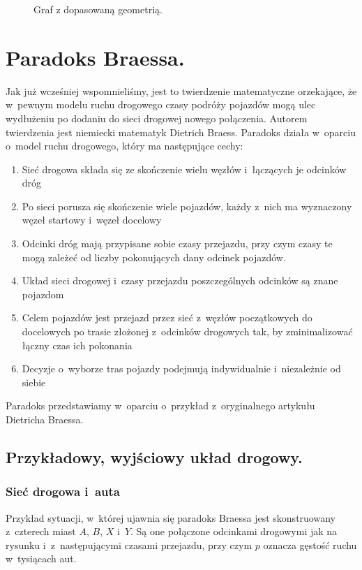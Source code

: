 \documentclass[twoside,12pt]{report}
\begin{document}
\begin{figure}[h]
\begin{flushright}
\begin{minipage}[]{.45\textwidth}
	\caption{Graf z dopasowaną geometrią.}
	\end{minipage}
\end{flushright}
\end{figure}

\section{Paradoks Braessa.}

Jak już wcześniej wspomnieliśmy, jest to twierdzenie matematyczne orzekające, że w~pewnym modelu ruchu drogowego czasy podróży pojazdów mogą ulec wydłużeniu po dodaniu do sieci drogowej nowego połączenia. Autorem twierdzenia jest niemiecki matematyk Dietrich Braess\cite{braess}. Paradoks działa w~oparciu o~model ruchu drogowego, który ma następujące cechy:

\begin{enumerate}
\item Sieć drogowa składa się ze skończenie wielu węzłów i~łączących je odcinków dróg
\item Po sieci porusza się skończenie wiele pojazdów, każdy z~nich ma wyznaczony węzeł startowy i~węzeł docelowy
\item Odcinki dróg mają przypisane sobie czasy przejazdu, przy czym czasy te mogą zależeć od liczby pokonujących dany odcinek pojazdów.
\item Układ sieci drogowej i~czasy przejazdu poszczególnych odcinków są znane pojazdom
\item Celem pojazdów jest przejazd przez sieć z~węzłów początkowych do docelowych po trasie złożonej z~odcinków drogowych tak, by zminimalizować łączny czas ich pokonania
\item Decyzje o~wyborze tras pojazdy podejmują indywidualnie i~niezależnie od siebie
\end{enumerate}
Paradoks przedstawiamy w~oparciu o~przykład z~oryginalnego artykułu Dietricha Braessa\cite{paradox}.

\subsection{Przykładowy, wyjściowy układ drogowy.}
\subsubsection{Sieć drogowa i~auta}

Przykład sytuacji, w~której ujawnia się paradoks Braessa jest skonstruowany z~czterech miast $A$, $B$, $X$ i~$Y$. Są one połączone odcinkami drogowymi jak na rysunku i~z~następującymi czasami przejazdu, przy czym $p$ oznacza gęstość ruchu w~tysiącach aut.
\end{document}
